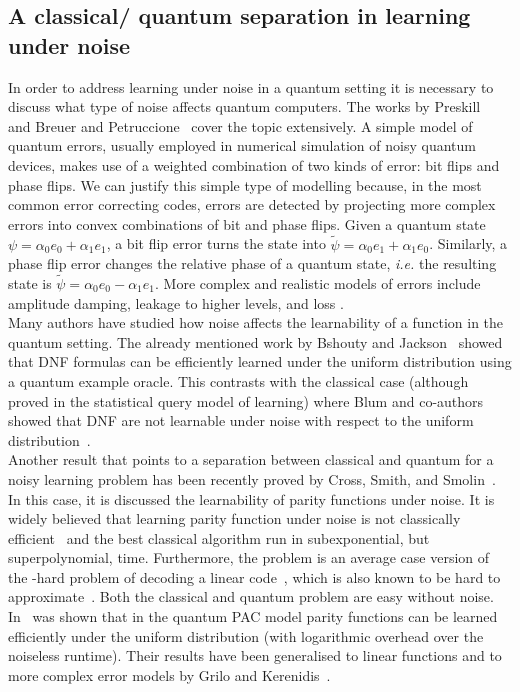\documentclass[a4paper, 11pt]{article}
\begin{document}
\subsection*{A classical/ quantum separation in learning under noise}

In order to address learning under noise in a quantum setting it is necessary to discuss what type of noise affects quantum computers. The works by Preskill~\cite{preskill1998fault} and Breuer and Petruccione~\cite{breuer2002theory} cover the topic extensively. A simple model of quantum errors, usually employed in numerical simulation of noisy quantum devices, makes use of a weighted combination of two kinds of error: bit flips and phase flips. We can justify this simple type of modelling because, in the most common error correcting codes, errors are detected by projecting more complex errors into convex combinations of bit and phase flips. Given a quantum state $\psi = \alpha_0 e_0 + \alpha_1 e_1$, a bit flip error turns the state into $\tilde{\psi} = \alpha_0 e_1 + \alpha_1 e_0$. Similarly, a phase flip error changes the relative phase of a quantum state, \textit{i.e.} the resulting state is  $\tilde{\psi} = \alpha_0 e_0 - \alpha_1 e_1$. More complex and realistic models of errors include amplitude damping, leakage to higher levels, and loss .\\

Many authors have studied how noise affects the learnability of a function in the quantum setting. The already mentioned work by Bshouty and Jackson~\cite{bshouty1998learning} showed that DNF formulas can be efficiently learned under the uniform distribution using a quantum example oracle. This contrasts with the classical case (although proved in the statistical query model of learning) where Blum and co-authors showed that DNF are not learnable under noise with respect to the uniform distribution~\cite{blum1994weakly}. \\

Another result that points to a separation between classical and quantum for a noisy learning problem has been recently proved by Cross, Smith, and Smolin~\cite{cross2015quantum}. In this case, it is discussed the learnability of parity functions under noise. It is widely believed that learning parity function under noise is not classically efficient~\cite{lyubashevsky2005parity} and the best classical algorithm run in subexponential, but superpolynomial, time. Furthermore, the problem is an average case version of the \NP-hard problem of decoding a linear code~\cite{berlekamp1978inherent}, which is also known to be hard to approximate~\cite{haastad2001some}. Both the classical and quantum problem are easy without noise. In~\cite{cross2015quantum} was shown that in the quantum PAC model parity functions can be learned efficiently under the uniform distribution (with logarithmic overhead over the noiseless runtime). Their results have been generalised to linear functions and to more complex error models by Grilo and Kerenidis~\cite{grilo2017learning}. \\
\end{document}
